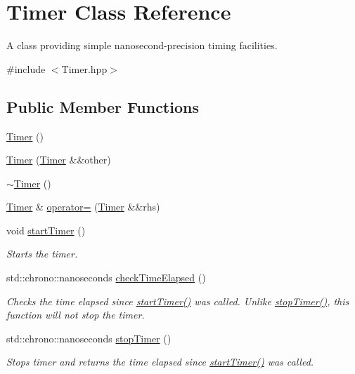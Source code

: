 \hypertarget{class_timer}{\section{Timer Class Reference}
\label{class_timer}
}


A class providing simple nanosecond-\/precision timing facilities.  




{\ttfamily \#include $<$Timer.\-hpp$>$}

\subsection*{Public Member Functions}
\begin{DoxyCompactItemize}
\item 
\hyperlink{class_timer_a5f16e8da27d2a5a5242dead46de05d97}{Timer} ()
\item 
\hyperlink{class_timer_a0edd539085fac3d019a3465bab2ef3c2}{Timer} (\hyperlink{class_timer}{Timer} \&\&other)
\item 
\hyperlink{class_timer_a14fa469c4c295c5fa6e66a4ad1092146}{$\sim$\-Timer} ()
\item 
\hyperlink{class_timer}{Timer} \& \hyperlink{class_timer_afbca4871f4efb5aafb3078655ef9dda0}{operator=} (\hyperlink{class_timer}{Timer} \&\&rhs)
\item 
void \hyperlink{class_timer_aa8c887576ec3b0d68c10ebf4097c367c}{start\-Timer} ()
\begin{DoxyCompactList}\small\item\em Starts the timer. \end{DoxyCompactList}\item 
std\-::chrono\-::nanoseconds \hyperlink{class_timer_a0ef64385b0e418f5caf8a61f254a8800}{check\-Time\-Elapsed} ()
\begin{DoxyCompactList}\small\item\em Checks the time elapsed since \hyperlink{class_timer_aa8c887576ec3b0d68c10ebf4097c367c}{start\-Timer()} was called. Unlike \hyperlink{class_timer_a3e55a0766fdb73df26dc4705641eccb6}{stop\-Timer()}, this function will not stop the timer. \end{DoxyCompactList}\item 
std\-::chrono\-::nanoseconds \hyperlink{class_timer_a3e55a0766fdb73df26dc4705641eccb6}{stop\-Timer} ()
\begin{DoxyCompactList}\small\item\em Stops timer and returns the time elapsed since \hyperlink{class_timer_aa8c887576ec3b0d68c10ebf4097c367c}{start\-Timer()} was called. \end{DoxyCompactList}\end{DoxyCompactItemize}


